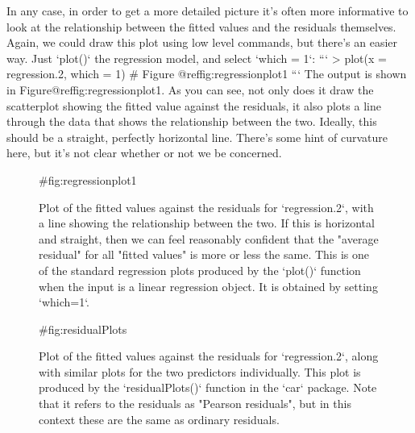 In any case, in order to get a more detailed picture it's often more informative to look at the relationship between the fitted values and the residuals themselves. Again, we could draw this plot using low level commands, but there's an easier way. Just `plot()` the regression model, and select `which = 1`:
```
> plot(x = regression.2, which = 1)   # Figure @ref{fig:regressionplot1}
```
The output is shown in Figure@reffig:regressionplot1. As you can see, not only does it draw the scatterplot showing the fitted value against the residuals, it also plots a line through the data that shows the relationship between the two. Ideally, this should be a straight, perfectly horizontal line. There's some hint of curvature here, but it's not clear whether or not we be concerned. 

\begin{figure}[t]
\begin{center}
\caption{Plot of the fitted values against the residuals for `regression.2`, with a line showing the relationship between the two. If this is horizontal and straight, then we can feel reasonably confident that the "average residual" for all "fitted values" is more or less the same. This is one of the standard regression plots produced by the `plot()` function when the input is a linear regression object. It is obtained by setting `which=1`.}
{#fig:regressionplot1}
\HR
\end{center}
\end{figure}

\begin{figure}[t]
\begin{center}
\caption{Plot of the fitted values against the residuals for `regression.2`, along with similar plots for the two predictors individually. This plot is produced by the `residualPlots()` function in the `car` package. Note that it refers to the residuals as "Pearson residuals", but in this context these are the same as ordinary residuals. }
{#fig:residualPlots}
\HR
\end{center}
\end{figure}


